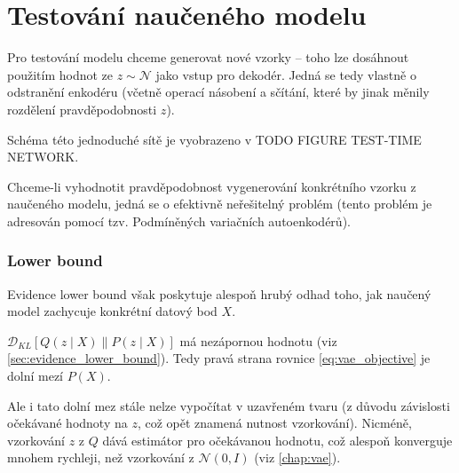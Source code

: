 \section{Testování naučeného modelu}
Pro testování modelu chceme generovat nové vzorky – toho lze dosáhnout použitím hodnot ze $z \sim \mathcal{N}$ jako vstup pro dekodér.
Jedná se tedy vlastně o odstranění enkodéru (včetně operací násobení a sčítání, které by jinak měnily rozdělení pravděpodobnosti $z$).

Schéma této jednoduché sítě je vyobrazeno v TODO FIGURE TEST-TIME NETWORK.

Chceme-li vyhodnotit pravděpodobnost vygenerování konkrétního vzorku z naučeného modelu, jedná se o efektivně neřešitelný problém (tento problém je adresován pomocí tzv. Podmíněných variačních autoenkodérů).

\subsubsection{Lower bound}
Evidence lower bound však poskytuje alespoň hrubý odhad toho, jak naučený model zachycuje konkrétní datový bod $X$.

$\mathcal{D}_{KL}\left[ Q(z\mid X) \parallel P(z\mid X) \right]$ má nezápornou hodnotu (viz \autoref{sec:evidence_lower_bound}).
Tedy pravá strana rovnice \autoref{eq:vae_objective} je dolní mezí $P(X)$.

Ale i tato dolní mez stále nelze vypočítat v uzavřeném tvaru (z důvodu závislosti očekávané hodnoty na $z$, což opět znamená nutnost vzorkování).
Nicméně, vzorkování $z$ z $Q$ dává estimátor pro očekávanou hodnotu, což alespoň konverguje mnohem rychleji, než vzorkování z $\mathcal{N}(0, I)$ (viz \autoref{chap:vae}).

